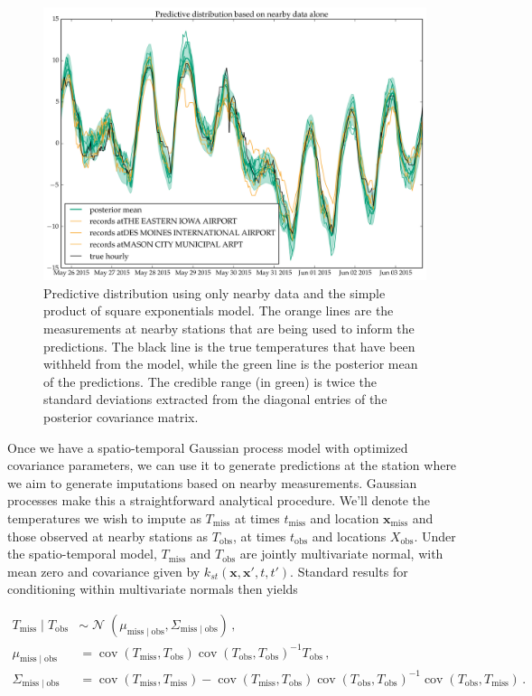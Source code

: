 \documentclass[letter]{article}
\makeatletter
\def\maxwidth{\ifdim\Gin@nat@width>\linewidth\linewidth
\else\Gin@nat@width\fi}
\let\Oldincludegraphics\includegraphics
\renewcommand{\includegraphics}[1]{\Oldincludegraphics[width=.8\maxwidth]{#1}}
\newcommand{\genericdel}[3]{%
      \left#1#3\right#2
    }
\newcommand{\del}[1]{\genericdel(){#1}}
\DeclareMathOperator{\cov}{{cov}}
\DeclareMathOperator{\normal}{\mathcal{N}}
\newcommand{\xvec}{\mathbf{x}}
\newcommand{\miss}{\mathrm{miss}}
\newcommand{\obs}{\mathrm{obs}}
\makeatother
\begin{document}
\begin{figure}
\centering
\includegraphics{figures/predictive_nearby_SEonly.png}
\caption{Predictive distribution using only nearby data and the simple
product of square exponentials model. The orange lines are the
measurements at nearby stations that are being used to inform the
predictions. The black line is the true temperatures that have been
withheld from the model, while the green line is the posterior mean of
the predictions. The credible range (in green) is twice the standard
deviations extracted from the diagonal entries of the posterior
covariance matrix.}
\end{figure}

Once we have a spatio-temporal Gaussian process model with optimized
covariance parameters, we can use it to generate predictions at the
station where we aim to generate imputations based on nearby
measurements. Gaussian processes make this a straightforward analytical
procedure. We'll denote the temperatures we wish to impute as
\(T_\miss{}\) at times \(t_\miss\) and location \(\xvec_\miss\) and
those observed at nearby stations as \(T_\obs{}\), at times \(t_\obs\)
and locations \(X_\obs\). Under the spatio-temporal model, \(T_\miss\)
and \(T_\obs\) are jointly multivariate normal, with mean zero and
covariance given by \(k_{st}(\xvec,\xvec',t,t')\). Standard results for
conditioning within multivariate normals then yields

\begin{align}
    T_\miss \mid T_\obs &\sim \normal\del{\mu_{\miss \mid \obs}, \Sigma_{\miss \mid \obs}}\,, \\
    \mu_{\miss \mid \obs} &= \cov\del{T_\miss, T_\obs} \cov\del{T_\obs, T_\obs}^{-1} T_\obs\,, \\
    \Sigma_{\miss \mid \obs} &= \cov\del{T_\miss,T_\miss} - \cov\del{T_\miss, T_\obs} \cov\del{T_\obs, T_\obs}^{-1} \cov\del{T_\obs, T_\miss}\,. \\ %
\end{align}
\end{document}
